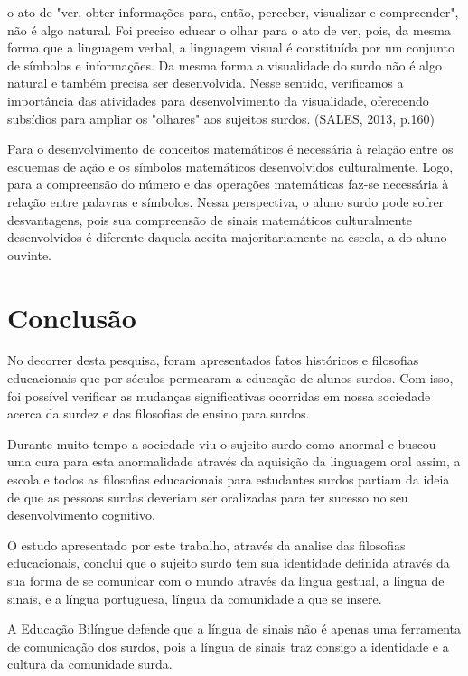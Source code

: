 \documentclass[brasil]{abnt}
\begin{document}
			\begin{citacao} [...] o ato de "ver, obter informações para, então, perceber, visualizar e compreender", não é algo natural. Foi preciso educar o olhar para o ato de ver, pois, da mesma forma que a linguagem verbal, 
							a linguagem visual é constituída por um conjunto de símbolos e informações. Da mesma forma a visualidade do surdo não é algo natural e também precisa ser desenvolvida. Nesse sentido, verificamos
							a importância das atividades para desenvolvimento da visualidade, oferecendo subsídios para ampliar os "olhares" aos sujeitos surdos. (SALES, 2013, p.160) 
			\end{citacao}
	
	Para o desenvolvimento de conceitos matemáticos é necessária à relação entre os esquemas de ação e os símbolos matemáticos desenvolvidos culturalmente. Logo, para a compreensão do número e das operações 
	matemáticas faz-se necessária à relação entre palavras e símbolos. Nessa perspectiva, o aluno surdo pode sofrer desvantagens, pois sua compreensão de sinais matemáticos culturalmente desenvolvidos é 
	diferente daquela aceita majoritariamente na escola, a do aluno ouvinte.

\chapter*{Conclusão}  

	No decorrer desta pesquisa, foram apresentados fatos históricos e filosofias educacionais que por séculos permearam a educação de alunos surdos. Com isso, foi possível verificar as mudanças
	significativas ocorridas em nossa sociedade acerca da surdez e das filosofias  de ensino para surdos. 
	
	Durante muito tempo a sociedade viu o sujeito surdo como anormal e buscou uma cura para esta anormalidade
	através da aquisição da linguagem oral assim, a escola e todos as filosofias educacionais para estudantes surdos partiam da ideia de que as pessoas surdas deveriam ser oralizadas para ter sucesso no seu 
	desenvolvimento cognitivo.  
	
	O estudo apresentado por este trabalho, através da analise das filosofias educacionais, conclui que o sujeito surdo tem sua identidade definida através da sua forma de se comunicar com o mundo através da língua gestual, a língua de sinais, e a língua portuguesa, língua da comunidade a que se insere. 
	
	A Educação Bilíngue defende que a língua de sinais não é apenas uma ferramenta de comunicação dos surdos, pois a língua de sinais traz consigo a identidade e a cultura da comunidade surda. 
	
\end{document}

